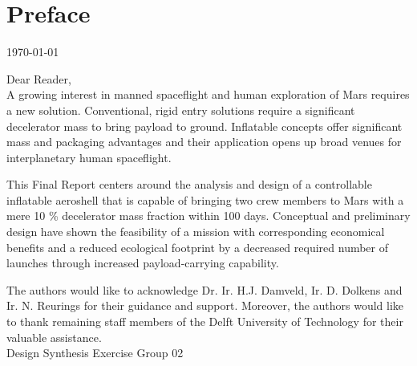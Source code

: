 \section*{Preface}\label{cha:preface}

\begin{flushright}
	\today
\end{flushright}

Dear Reader,	
\\ [1cm]
A growing interest in manned spaceflight and human exploration of Mars requires a new solution. Conventional, rigid entry solutions require a significant decelerator mass to bring payload to ground. Inflatable concepts offer significant mass and packaging advantages and their application opens up broad venues for interplanetary human spaceflight. 

This Final Report centers around the analysis and design of a controllable inflatable aeroshell that is capable of bringing two crew members to Mars with a mere 10 \% decelerator mass fraction within 100 days. Conceptual and preliminary design have shown the feasibility of a mission with corresponding economical benefits and a reduced ecological footprint by a decreased required number of launches through increased payload-carrying capability.

The authors would like to acknowledge Dr. Ir. H.J. Damveld, Ir. D. Dolkens and Ir. N. Reurings for their guidance and support. Moreover, the authors would like to thank remaining staff members of the Delft University of Technology for their valuable assistance.
\\ [1.5cm]
Design Synthesis Exercise Group 02

